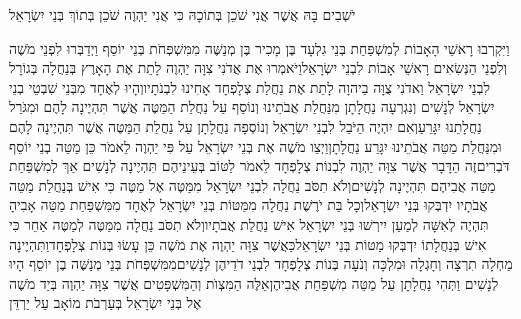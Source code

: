 \documentclass[../main/main.tex]{subfiles}
\begin{document}
\begin{multicols}{\ncols}
יֹשְׁבִים בָּהּ אֲשֶׁר אֲנִי שֹׁכֵן בְּתוֹכָהּ כִּי אֲנִי יַהְוֶה שֹׁכֵן בְּתוֹךְ בְּנֵי יִשְׂרָאֵל\OpenSection{}\par
{}וַיִּקְרְבוּ רָאשֵׁי הָאָבוֹת לְמִשְׁפַּחַת בְּנֵי גִלְעָד בֶּן מָכִיר בֶּן מְנַשֶּׁה מִמִּשְׁפְּחֹת בְּנֵי יוֹסֵף וַיְדַבְּרוּ לִפְנֵי מֹשֶׁה וְלִפְנֵי הַנְּשִׂאִים רָאשֵׁי אָבוֹת לִבְנֵי יִשְׂרָאֵל\PreVerseSpace{}וַיֹּאמְרוּ אֶת אֲדֹנִי צִוָּה יַהְוֶה לָתֵת אֶת הָאָרֶץ בְּנַחֲלָה בְּגוֹרָל לִבְנֵי יִשְׂרָאֵל וַאדֹנִי צֻוָּה בַיהוָה לָתֵת אֶת נַחֲלַת צְלָפְחָד אָחִינוּ לִבְנֹתָיו\PreVerseSpace{}וְהָיוּ לְאֶחָד מִבְּנֵי שִׁבְטֵי בְנֵי יִשְׂרָאֵל לְנָשִׁים וְנִגְרְעָה נַחֲלָתָן מִנַּחֲלַת אֲבֹתֵינוּ וְנוֹסַף עַל נַחֲלַת הַמַּטֶּה אֲשֶׁר תִּהְיֶינָה לָהֶם וּמִגֹּרַל נַחֲלָתֵנוּ יִגָּרֵעַ\PreVerseSpace{}וְאִם יִהְיֶה הַיֹּבֵל לִבְנֵי יִשְׂרָאֵל וְנוֹסְפָה נַחֲלָתָן עַל נַחֲלַת הַמַּטֶּה אֲשֶׁר תִּהְיֶינָה לָהֶם וּמִנַּחֲלַת מַטֵּה אֲבֹתֵינוּ יִגָּרַע נַחֲלָתָן\PreVerseSpace{}וַיְצַו מֹשֶׁה אֶת בְּנֵי יִשְׂרָאֵל עַל פִּי יַהְוֶה לֵאמֹר כֵּן מַטֵּה בְנֵי יוֹסֵף דֹּבְרִים\PreVerseSpace{}זֶה הַדָּבָר אֲשֶׁר צִוָּה יַהְוֶה לִבְנוֹת צְלָפְחָד לֵאמֹר לַטּוֹב בְּעֵינֵיהֶם תִּהְיֶינָה לְנָשִׁים אַךְ לְמִשְׁפַּחַת מַטֵּה אֲבִיהֶם תִּהְיֶינָה לְנָשִׁים\PreVerseSpace{}וְלֹא תִסֹּב נַחֲלָה לִבְנֵי יִשְׂרָאֵל מִמַּטֶּה אֶל מַטֶּה כִּי אִישׁ בְּנַחֲלַת מַטֵּה אֲבֹתָיו יִדְבְּקוּ בְּנֵי יִשְׂרָאֵל\PreVerseSpace{}וְכָל בַּת יֹרֶשֶׁת נַחֲלָה מִמַּטּוֹת בְּנֵי יִשְׂרָאֵל לְאֶחָד מִמִּשְׁפַּחַת מַטֵּה אָבִיהָ תִּהְיֶה לְאִשָּׁה לְמַעַן יִירְשׁוּ בְּנֵי יִשְׂרָאֵל אִישׁ נַחֲלַת אֲבֹתָיו\PreVerseSpace{}וְלֹא תִסֹּב נַחֲלָה מִמַּטֶּה לְמַטֶּה אַחֵר כִּי אִישׁ בְּנַחֲלָתוֹ יִדְבְּקוּ מַטּוֹת בְּנֵי יִשְׂרָאֵל\PreVerseSpace{}כַּאֲשֶׁר צִוָּה יַהְוֶה אֶת מֹשֶׁה כֵּן עָשׂוּ בְּנוֹת צְלָפְחָד\PreVerseSpace{}וַתִּהְיֶינָה מַחְלָה תִרְצָה וְחָגְלָה וּמִלְכָּה וְנֹעָה בְּנוֹת צְלָפְחָד לִבְנֵי דֹדֵיהֶן לְנָשִׁים\PreVerseSpace{}מִמִּשְׁפְּחֹת בְּנֵי מְנַשֶּׁה בֶן יוֹסֵף הָיוּ לְנָשִׁים וַתְּהִי נַחֲלָתָן עַל מַטֵּה מִשְׁפַּחַת אֲבִיהֶן\PreVerseSpace{}אֵלֶּה הַמִּצְוֺת וְהַמִּשְׁפָּטִים אֲשֶׁר צִוָּה יַהְוֶה בְּיַד מֹשֶׁה אֶל בְּנֵי יִשְׂרָאֵל בְּעַרְבֹת מוֹאָב עַל יַרְדֵּן\par
\pagebreak
\end{multicols}
\end{document}
